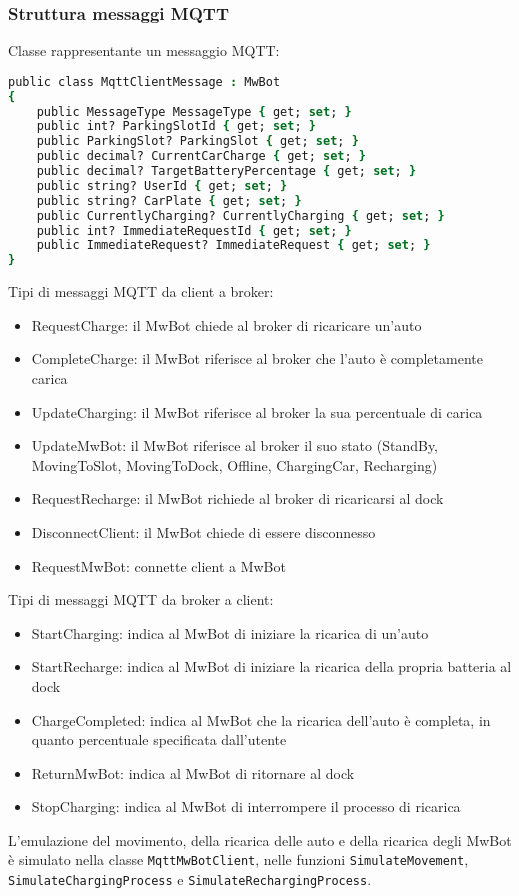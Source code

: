 \documentclass{article}
\begin{document}
\subsubsection{Struttura messaggi MQTT}
Classe rappresentante un messaggio MQTT:
\begin{lstlisting}[language=csh]
    public class MqttClientMessage : MwBot
{
    public MessageType MessageType { get; set; }
    public int? ParkingSlotId { get; set; }
    public ParkingSlot? ParkingSlot { get; set; }
    public decimal? CurrentCarCharge { get; set; }
    public decimal? TargetBatteryPercentage { get; set; }
    public string? UserId { get; set; }
    public string? CarPlate { get; set; }
    public CurrentlyCharging? CurrentlyCharging { get; set; }
    public int? ImmediateRequestId { get; set; }
    public ImmediateRequest? ImmediateRequest { get; set; }
}
\end{lstlisting}
Tipi di messaggi MQTT da client a broker:
\begin{itemize}
    \item RequestCharge: il MwBot chiede al broker di ricaricare un'auto
    \item CompleteCharge: il MwBot riferisce al broker che l'auto è completamente carica
    \item UpdateCharging: il MwBot riferisce al broker la sua percentuale di carica
    \item UpdateMwBot: il MwBot riferisce al broker il suo stato (StandBy, MovingToSlot, MovingToDock, Offline, ChargingCar, Recharging)
    \item RequestRecharge: il MwBot richiede al broker di ricaricarsi al dock
    \item DisconnectClient: il MwBot chiede di essere disconnesso
    \item RequestMwBot: connette client a MwBot
\end{itemize}
Tipi di messaggi MQTT da broker a client:
\begin{itemize}
    \item StartCharging: indica al MwBot di iniziare la ricarica di un'auto
    \item StartRecharge: indica al MwBot di iniziare la ricarica della propria batteria al dock
    \item ChargeCompleted: indica al MwBot che la ricarica dell'auto è completa, in quanto percentuale specificata dall'utente
    \item ReturnMwBot: indica al MwBot di ritornare al dock
    \item StopCharging: indica al MwBot di interrompere il processo di ricarica
\end{itemize}
L'emulazione del movimento, della ricarica delle auto e della ricarica degli MwBot è simulato nella classe \texttt{MqttMwBotClient}, nelle funzioni \texttt{SimulateMovement}, \texttt{SimulateChargingProcess} e \texttt{SimulateRechargingProcess}.
\end{document}
